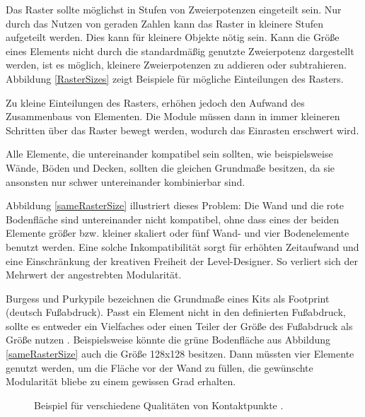 Das Raster sollte möglichst in Stufen von Zweierpotenzen eingeteilt sein. Nur durch das Nutzen von geraden Zahlen kann das Raster in kleinere Stufen aufgeteilt werden. Dies kann für kleinere Objekte nötig sein. Kann die Größe eines Elements nicht durch die standardmäßig genutzte Zweierpotenz dargestellt werden, ist es möglich, kleinere Zweierpotenzen zu addieren oder subtrahieren. Abbildung \ref{RasterSizes} zeigt Beispiele für mögliche Einteilungen des Rasters. \parencite{Mader}
\par
Zu kleine Einteilungen des Rasters, erhöhen jedoch den Aufwand des Zusammenbaus von Elementen. Die Module müssen dann in immer kleineren Schritten über das Raster bewegt werden, wodurch das Einrasten erschwert wird. \parencite{Mader} 
\par
Alle Elemente, die untereinander kompatibel sein sollten, wie beispielsweise Wände, Böden und Decken, sollten die gleichen Grundmaße besitzen, da sie ansonsten nur schwer untereinander kombinierbar sind. \parencite{Mader}
\par
Abbildung \ref{sameRasterSize} illustriert dieses Problem: Die Wand und die rote Bodenfläche sind untereinander nicht kompatibel, ohne dass eines der beiden Elemente größer bzw. kleiner skaliert oder fünf Wand- und vier Bodenelemente benutzt werden. Eine solche Inkompatibilität sorgt für erhöhten Zeitaufwand und eine Einschränkung der kreativen Freiheit der Level-Designer. So verliert sich der Mehrwert der angestrebten Modularität.
\par
Burgess und Purkypile bezeichnen die Grundmaße eines Kits als Footprint (deutsch Fußabdruck). Passt ein Element nicht in den definierten Fußabdruck, sollte es entweder ein Vielfaches oder einen Teiler der Größe des Fußabdruck als Größe nutzen \parencite{Burgess}.
\enlargethispage{10.5pt}
\newpage
Beispielsweise könnte die grüne Bodenfläche aus Abbildung \ref{sameRasterSize} auch die Größe 128x128 besitzen. Dann müssten vier Elemente genutzt werden, um die Fläche vor der Wand zu füllen, die gewünschte Modularität bliebe zu einem gewissen Grad erhalten.
 \begin{figure}[!h]
\centering
  \caption{Beispiel für verschiedene Qualitäten von Kontaktpunkte \parencite{Klafke}.}
	\label{boundingBox}
\end{figure}
